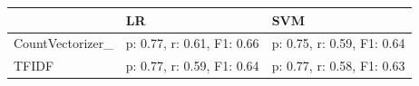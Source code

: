 \documentclass[12pt, a4paper, titlepage]{article}
\begin{document}
  \begin{tabular}{l|l|l|}
    \hline
  {} &                          LR &                         SVM \\
  \hline
  CountVectorizer\_ &  p: 0.77, r: 0.61, F1: 0.66 &  p: 0.75, r: 0.59, F1: 0.64 \\
  TFIDF            &  p: 0.77, r: 0.59, F1: 0.64 &  p: 0.77, r: 0.58, F1: 0.63 \\
  \hline
  \end{tabular}

\clearpage



    
\end{document}
